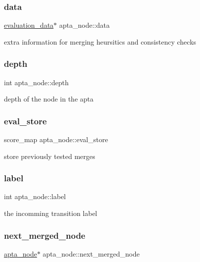 \subsubsection{\texorpdfstring{data}{data}}
{\footnotesize\ttfamily \hyperlink{classevaluation__data}{evaluation\+\_\+data}$\ast$ apta\+\_\+node\+::data}

extra information for merging heursitics and consistency checks \mbox{\label{classapta__node_af55f64e7181c083d997bdf8b85cbe4d8}} 
\subsubsection{\texorpdfstring{depth}{depth}}
{\footnotesize\ttfamily int apta\+\_\+node\+::depth}

depth of the node in the apta \mbox{\label{classapta__node_a61b271696a3f73cb1b5c74a303542522}} 
\subsubsection{\texorpdfstring{eval\+\_\+store}{eval\_store}}
{\footnotesize\ttfamily score\+\_\+map apta\+\_\+node\+::eval\+\_\+store}

store previously tested merges \mbox{\label{classapta__node_aaba8e9487f1161584177a708aa700bea}} 
\subsubsection{\texorpdfstring{label}{label}}
{\footnotesize\ttfamily int apta\+\_\+node\+::label}

the incomming transition label \mbox{\label{classapta__node_ae86864ade772ac79085a9c058f880f52}} 
\subsubsection{\texorpdfstring{next\+\_\+merged\+\_\+node}{next\_merged\_node}}
{\footnotesize\ttfamily \hyperlink{classapta__node}{apta\+\_\+node}$\ast$ apta\+\_\+node\+::next\+\_\+merged\+\_\+node}

